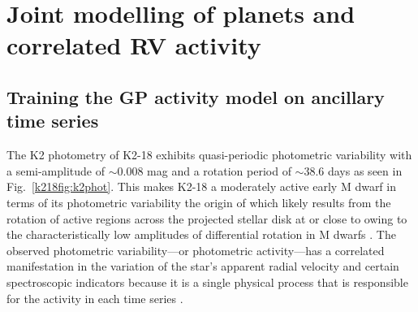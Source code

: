\section{Joint modelling of planets and correlated RV activity} \label{k218sect:joint}
\subsection{Training the GP activity model on ancillary time series} \label{k218sect:gp}
The K2 photometry of K2-18 exhibits quasi-periodic photometric variability with a
semi-amplitude of $\sim 0.008$ mag and a rotation period of \prot{} $\sim 38.6$ days as
seen in Fig.~\ref{k218fig:k2phot}. This makes K2-18
a moderately active early M dwarf in terms of its photometric variability \citep{newton16a}
the origin of which likely results from the rotation of active regions across the projected stellar
disk at or close to \prot{} owing to the characteristically low amplitudes of differential
rotation in M dwarfs \citep{kitchatinov11}. 
The observed photometric variability---or photometric activity---has
a correlated manifestation in the
variation of the star's apparent radial velocity and certain spectroscopic indicators
because it is a single physical process that is responsible for the activity in each
time series \citep{aigrain12}. \\


